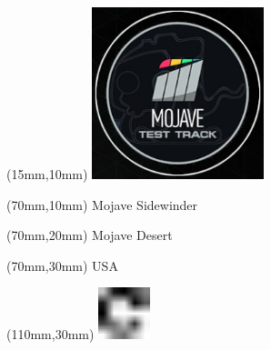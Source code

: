 \null\newpage
\begin{textblock*}{50mm}(15mm,10mm)%
\includegraphics[width=50mm]{LG/MOJA.png}
\end{textblock*}
\begin{textblock*}{130mm}(70mm,10mm)%
{\fontsize{20}{20}\selectfont Mojave Sidewinder}\\
\end{textblock*}
\begin{textblock*}{120mm}(70mm,20mm)%
{\fontsize{16}{16}\selectfont Mojave Desert}\\
\end{textblock*}
\begin{textblock*}{120mm}(70mm,30mm)%
{\fontsize{12}{12}\selectfont USA}
\end{textblock*}
\begin{textblock*}{30mm}(110mm,30mm)%
\centering
\includegraphics[height=15mm]{icons/fa-rotate-right.pdf}
\end{textblock*}
